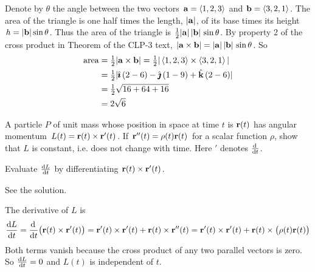 \begin{solution}
Denote by $\theta$ the angle between the two vectors
$\mathbf{a}=\left< 1,2,3\right>$ and $\mathbf{b}=\left< 3,2,1\right>$. The area of the triangle is one 
half times the length, $|\mathbf{a}|$, of its base times its height 
$h=|\mathbf{b}|\sin\theta$. 
%
Thus the area of the triangle is  $\tfrac{1}{2}|\mathbf{a}|\,|\mathbf{b}|\,\sin\theta$.
By property 2 of the cross product in Theorem 
of the CLP-3 text,
 $|\mathbf{a}\times\mathbf{b}|=|\mathbf{a}|\,|\mathbf{b}|\,\sin\theta$. So
\begin{align*}
\text{area} &= \tfrac{1}{2}|\mathbf{a}\times\mathbf{b}|
=\tfrac{1}{2}|\left< 1,2,3\right>\times\left< 3,2,1\right>| \\
&=\tfrac{1}{2} | \hat{\pmb{\imath}}\,(2-6)-\hat{\pmb{\jmath}}\,(1-9) +\hat{\mathbf{k}}\,(2-6)| \\
&=\tfrac{1}{2}\sqrt{16+64+16} \\
&=2\sqrt{6} 
\end{align*}
\end{solution}

\begin{question}[M200 2003D] %
 A particle $P$ of unit mass whose position in space at time
$t$ is $\mathbf{r}(t)$ has angular momentum $L(t)=\mathbf{r}(t)\times\mathbf{r}'(t)$.
If $\mathbf{r}''(t)=\rho(t)\mathbf{r}(t)$ for a scalar function $\rho$, show that
$L$ is constant, i.e. does not change with time. Here $'$ denotes 
$\diff{}{t}$.
\end{question}

\begin{hint}
Evaluate $\diff{L}{t}$ by differentiating $\mathbf{r}(t)\times\mathbf{r}'(t)$.
\end{hint}

\begin{answer}
See the solution.
\end{answer}

\begin{solution}
The derivative of $L$ is
\begin{align*}
\diff{L}{t}=\diff{}{t}\big(\vr(t)\times\vr'(t)\big)
=\vr'(t)\times\vr'(t)+\vr(t)\times\vr''(t)
=\vr'(t)\times\vr'(t)+\vr(t)\times\big(\rho(t)\vr(t)\big)
\end{align*}
Both terms vanish because the cross product of any two parallel vectors
is zero. So $\diff{L}{t}=0$ and $L(t)$ is independent of $t$. 
\end{solution}




